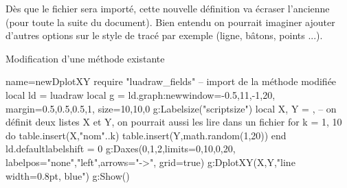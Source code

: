 Dès que le fichier sera importé, cette nouvelle définition va écraser l'ancienne (pour toute la suite du document). Bien entendu on pourrait imaginer ajouter d'autres options sur le style de tracé par exemple (ligne, bâtons, points ...).

\begin{demo}{Modification d'une méthode existante}
\begin{luadraw}{name=newDplotXY}
require "luadraw_fields" -- import de la méthode modifiée
local ld = luadraw
local g = ld.graph:new{window={-0.5,11,-1,20}, margin={0.5,0.5,0.5,1}, size={10,10,0}}
g:Labelsize("scriptsize")
local X, Y = {}, {} -- on définit deux listes X et Y, on pourrait aussi les lire dans un fichier
for k = 1, 10 do
    table.insert(X,"nom"..k)
    table.insert(Y,math.random(1,20))
end
ld.defaultlabelshift = 0
g:Daxes({0,1,2},{limits={{0,10},{0,20}}, labelpos={"none","left"},arrows="->", grid=true})
g:DplotXY(X,Y,"line width=0.8pt, blue")
g:Show()
\end{luadraw}
\end{demo}
